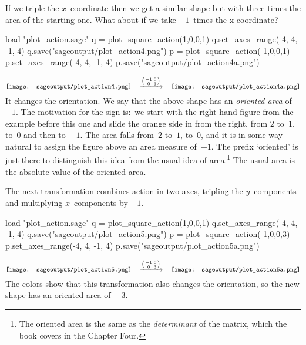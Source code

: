 If we triple the $x$~coordinate then we get a similar shape but with
three times the area of the starting one.
What about if we take $-1$~times the x-coordinate?
\begin{sageoutput}[d,0,4;d,5,7]
load "plot_action.sage"
q = plot_square_action(1,0,0,1) 
q.set_axes_range(-4, 4, -1, 4) 
q.save("sageoutput/plot_action4.png")
p = plot_square_action(-1,0,0,1) 
p.set_axes_range(-4, 4, -1, 4) 
p.save("sageoutput/plot_action4a.png")
\end{sageoutput}
\begin{equation*}
  \vcenteredhbox{\texttt{[image: sageoutput/plot\_action4.png]}}
  \quad\mapsvia{\big (\begin{smallmatrix} -1 &0 \\ 0 &1 \end{smallmatrix}\big )}\quad
  \vcenteredhbox{\texttt{[image: sageoutput/plot\_action4a.png]}}
\end{equation*}
\noindent
It changes the orientation.
We say that the above shape has an \textit{oriented area}
of $-1$.
The motivation for the sign is:~we start with the right-hand figure 
from the example before this one
and slide the orange side in from the right, from $2$ to~$1$, to~$0$ and
then to~$-1$.
The area falls from~$2$ to~$1$, to~$0$, and it is in some way natural
to assign the figure above an area measure of~$-1$.
The prefix `oriented' is just there to distinguish this idea from the
usual idea of 
area.\footnote{The oriented area is the same as the 
\protect\textit{determinant} of the matrix, which the book covers in the
Chapter Four.}
The usual area is the absolute value of the oriented area.

The next transformation combines action in two axes, 
tripling the $y$~components and multiplying 
$x$~components by $-1$. 
\begin{sageoutput}[d,0,4;d,5,7]
load "plot_action.sage"
q = plot_square_action(1,0,0,1) 
q.set_axes_range(-4, 4, -1, 4) 
q.save("sageoutput/plot_action5.png")
p = plot_square_action(-1,0,0,3) 
p.set_axes_range(-4, 4, -1, 4) 
p.save("sageoutput/plot_action5a.png")
\end{sageoutput}
\begin{equation*}
  \vcenteredhbox{\texttt{[image: sageoutput/plot\_action5.png]}}
  \quad\mapsvia{\big (\begin{smallmatrix} -1 &0 \\ 0 &3 \end{smallmatrix}\big )}\quad
  \vcenteredhbox{\texttt{[image: sageoutput/plot\_action5a.png]}}
\end{equation*}
The colors show that this transformation also changes
the orientation, so the new shape has an oriented area of~$-3$.

